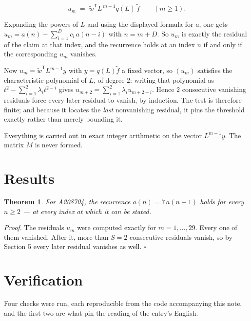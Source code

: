 \documentclass[11pt]{article}
\newtheorem{theorem}{Theorem}
\theoremstyle{definition}
\begin{document}
\[u_m \;=\; \tilde w^{\mathsf T} L^{\,m-1} q(L)\,\tilde f \qquad (m \ge 1).\]

Expanding the powers of $L$ and using the displayed formula for $a$, one gets $u_m = a(n) - \sum_{i=1}^{D} c_i\,a(n-i)$ with $n = m + D$. So $u_m$ is exactly the residual of the claim at that index, and the recurrence holds at an index $n$ if and only if the corresponding $u_m$ vanishes.

Now $u_m = \tilde w^{\mathsf T} L^{m-1} y$ with $y = q(L)\tilde f$ a fixed vector, so $(u_m)$ satisfies the characteristic polynomial of $L$, of degree $2$: writing that polynomial as $t^{2} - \sum_{i=1}^{2} \lambda_i t^{2-i}$ gives $u_{m+2} = \sum_{i=1}^{2} \lambda_i u_{m+2-i}$. Hence $2$ consecutive vanishing residuals force every later residual to vanish, by induction. The test is therefore finite; and because it locates the {\itshape last} nonvanishing residual, it pins the threshold exactly rather than merely bounding it.

Everything is carried out in exact integer arithmetic on the vector $L^{m-1}y$. The matrix $M$ is never formed.

\section{Results}

\begin{theorem} For A208704, the recurrence $a(n) = 7\,a(n-1)$ holds for every $n \ge 2$ --- at every index at which it can be stated.\end{theorem}

{\itshape Proof.} The residuals $u_m$ were computed exactly for $m = 1,\dots,29$. Every one of them vanished. After it, more than $S = 2$ consecutive residuals vanish, so by Section 5 every later residual vanishes as well. $\square$

\section{Verification}

Four checks were run, each reproducible from the code accompanying this note, and the first two are what pin the reading of the entry's English.
\end{document}

